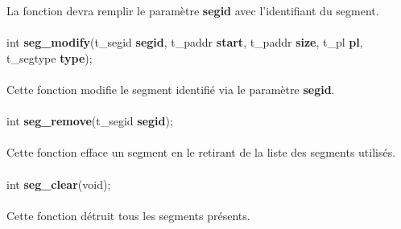 \documentclass[10pt,a4wide]{article}
\begin{document}
La fonction devra remplir le param\`etre \textbf{segid} avec l'identifiant
du segment.

\paragraph{}

\hspace{1.5cm}int \textbf{seg\_modify}(t\_segid \textbf{segid},
                                       t\_paddr \textbf{start},
                                       t\_paddr \textbf{size},
                                       t\_pl \textbf{pl},
                                       t\_segtype \textbf{type});

\paragraph{}

Cette fonction modifie le segment identifi\'e via le param\`etre
\textbf{segid}.

\paragraph{}

\hspace{1.5cm}int \textbf{seg\_remove}(t\_segid \textbf{segid});

\paragraph{}

Cette fonction efface un segment en le retirant de la liste des segments
utilis\'es.

\paragraph{}

\hspace{1.5cm}int \textbf{seg\_clear}(void);

\paragraph{}

Cette fonction d\'etruit tous les segments pr\'esents.

\paragraph{}
\end{document}
